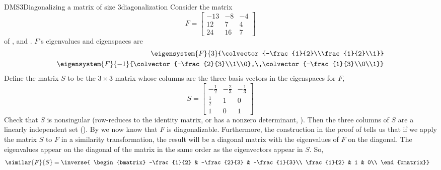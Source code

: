 \begin{example}{DMS3}{Diagonalizing a matrix of size 3}{diagonalization}
Consider the matrix
%
\begin{equation*}
F=
\begin{bmatrix}
-13 & -8 & -4\\ 
12 & 7 & 4\\ 
24 & 16 & 7
\end{bmatrix}
\end{equation*}
%
of ,  and .  $F$'s eigenvalues and eigenspaces are
%
\begin{align*}
\eigensystem{F}{3}{\colvector{-\frac{1}{2}\\\frac{1}{2}\\1}}\\
\eigensystem{F}{-1}{\colvector{-\frac{2}{3}\\1\\0},\,\colvector{-\frac{1}{3}\\0\\1}}
\end{align*}
%
Define the matrix $S$ to be the $3\times 3$ matrix whose columns are the three basis vectors in the eigenspaces for $F$,
%
\begin{equation*}
S=
\begin{bmatrix}
-\frac{1}{2} & -\frac{2}{3} & -\frac{1}{3}\\
\frac{1}{2} & 1 & 0\\
1 & 0 & 1
\end{bmatrix}
\end{equation*}
%
Check that $S$ is nonsingular (row-reduces to the identity matrix,  or has a nonzero determinant, ).  Then the three columns of $S$ are a linearly independent set ().  By  we now know that $F$ is diagonalizable.  Furthermore, the construction in the proof of  tells us that if we apply the matrix $S$ to $F$ in a similarity transformation, the result will be a diagonal matrix with the eigenvalues of $F$ on the diagonal.  The eigenvalues appear on the diagonal of the matrix in the same order as the eigenvectors appear in $S$.  So,
%
\begin{align*}
\similar{F}{S}&=
\inverse{
\begin{bmatrix}
-\frac{1}{2} & -\frac{2}{3} & -\frac{1}{3}\\
\frac{1}{2} & 1 & 0\\

\end{bmatrix}}
\end{align*}
\end{example}
